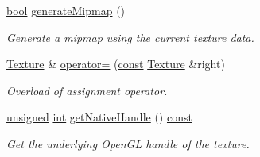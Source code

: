 \begin{DoxyCompactItemize}
\hyperlink{term__entry_8h_a002004ba5d663f149f6c38064926abac}{bool} \hyperlink{classsf_1_1_texture_a7779a75c0324b5faff77602f871710a9}{generate\-Mipmap} ()
\begin{DoxyCompactList}\small\item\em Generate a mipmap using the current texture data. \end{DoxyCompactList}\item 
\hyperlink{classsf_1_1_texture}{Texture} \& \hyperlink{classsf_1_1_texture_a80a089b6b19bb09b83012d5f0e6af9ba}{operator=} (\hyperlink{term__entry_8h_a57bd63ce7f9a353488880e3de6692d5a}{const} \hyperlink{classsf_1_1_texture}{Texture} \&right)
\begin{DoxyCompactList}\small\item\em Overload of assignment operator. \end{DoxyCompactList}\item 
\hyperlink{curses_8priv_8h_aca40206900cfc164654362fa8d4ad1e6}{unsigned} \hyperlink{term__entry_8h_ad65b480f8c8270356b45a9890f6499ae}{int} \hyperlink{classsf_1_1_texture_a14526d89b9008a3d851dc7b5e9532450}{get\-Native\-Handle} () \hyperlink{term__entry_8h_a57bd63ce7f9a353488880e3de6692d5a}{const} 
\begin{DoxyCompactList}\small\item\em Get the underlying Open\-G\-L handle of the texture. \end{DoxyCompactList}\end{DoxyCompactItemize}
